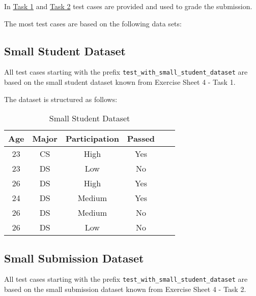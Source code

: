 \documentclass[
english,
smallborders
]{i6prcsht}
\begin{document}
In \hyperref[sec:task-one]{Task 1} and \hyperref[sec:task-one]{Task 2} test cases are provided and used to grade the submission.

The most test cases are based on the following data sets:

\subsection*{Small Student Dataset}

All test cases starting with the prefix \texttt{test\_with\_small\_student\_dataset} are based on the small student dataset known from Exercise Sheet 4 - Task 1.

The dataset is structured as follows:

\vspace*{1cm}

\begin{table}[ht]
	\centering
	\begin{tabular}{|c|c|c|c|c|c|}
		\hline
		\textbf{Age} & \textbf{Major} & \textbf{Participation} & \textbf{Passed} \\ \hline
		23           & CS             & High                   & Yes             \\ \hline
		23           & DS             & Low                    & No              \\ \hline
		26           & DS             & High                   & Yes             \\ \hline
		24           & DS             & Medium                 & Yes             \\ \hline
		26           & DS             & Medium                 & No              \\ \hline
		26           & DS             & Low                    & No              \\ \hline
	\end{tabular}
	\caption{Small Student Dataset}
	\label{tab:small-student-dataset}
\end{table}

\vspace*{1cm}

\subsection*{Small Submission Dataset}

All test cases starting with the prefix \texttt{test\_with\_small\_student\_dataset} are based on the small submission dataset known from Exercise Sheet 4 - Task 2.
\end{document}
